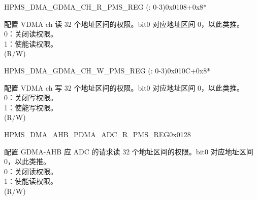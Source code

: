 \begin{register}{H}{PMS\_DMA\_GDMA\_CH\_R\_PMS\_REG (: 0-3)}{0x0108+0x8*}\label{regdesc:PMSDMAGDMACHNRPMSREG}
%
\regnewline%
\begin{regdesc}\begin{reglist}
\label{fielddesc:PMSDMAGDMACHNRPMS}\item [PMS\_DMA\_GDMA\_CH\regindex{n}\_R\_PMS] 配置 VDMA ch 读 32 个地址区间的权限。bit0 对应地址区间 0，以此类推。\\
0：关闭读权限。\\
1：使能读权限。\\ (R/W)
\end{reglist}\end{regdesc}
\end{register}


\begin{register}{H}{PMS\_DMA\_GDMA\_CH\_W\_PMS\_REG (: 0-3)}{0x010C+0x8*}\label{regdesc:PMSDMAGDMACHNWPMSREG}
%
\regnewline%
\begin{regdesc}\begin{reglist}
\label{fielddesc:PMSDMAGDMACHNWPMS}\item [PMS\_DMA\_GDMA\_CH\regindex{n}\_W\_PMS] 配置 VDMA ch 写 32 个地址区间的权限。bit0 对应地址区间 0，以此类推。\\
0：关闭写权限。\\
1：使能写权限。\\ (R/W)
\end{reglist}\end{regdesc}
\end{register}


\begin{register}{H}{PMS\_DMA\_AHB\_PDMA\_ADC\_R\_PMS\_REG}{0x0128}\label{regdesc:PMSDMAAHBPDMAADCRPMSREG}
%
\regnewline%
\begin{regdesc}\begin{reglist}
\label{fielddesc:PMSDMAAHBPDMAADCRPMS}\item [PMS\_DMA\_AHB\_PDMA\_ADC\_R\_PMS] 配置 GDMA-AHB 应 ADC 的请求读 32 个地址区间的权限。bit0 对应地址区间 0，以此类推。\\
0：关闭读权限。\\
1：使能读权限。\\ (R/W)
\end{reglist}\end{regdesc}
\end{register}


